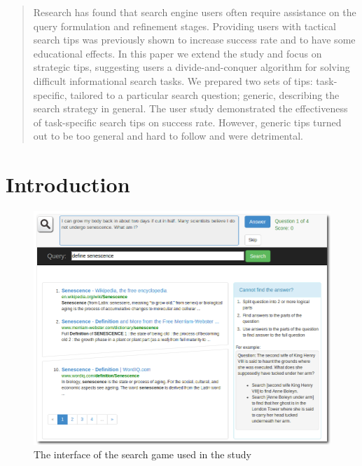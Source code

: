\documentclass{sig-alternate}
\begin{document}
\maketitle
\begin{abstract}
Research has found that search engine users often require assistance on the query formulation and refinement stages.
Providing users with tactical search tips was previously shown to increase success rate and to have some educational effects.
In this paper we extend the study and focus on strategic tips, suggesting users a divide-and-conquer algorithm for solving difficult informational search tasks.
We prepared two sets of tips: task-specific, tailored to a particular search question; generic, describing the search strategy in general.
The user study demonstrated the effectiveness of task-specific search tips on success rate.
However, generic tips turned out to be too general and hard to follow and were detrimental.

\end{abstract}




\section{Introduction}

\begin{figure}
\centering
\includegraphics[scale=0.28]{img/ufindit}
\caption{The interface of the search game used in the study}
\label{figure:ufindit}
\end{figure}
\end{document}
